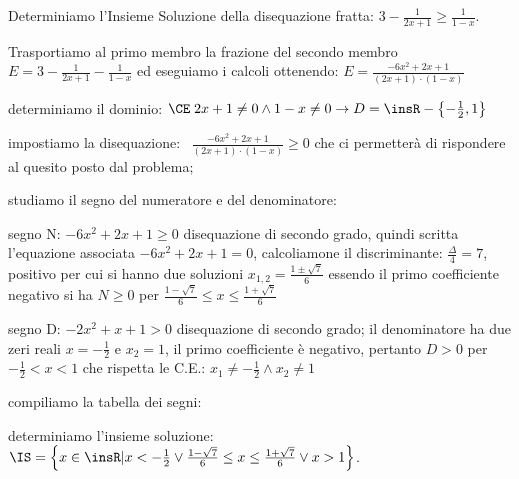\begin{exrig}
\begin{esempio}
Determiniamo l'Insieme Soluzione della disequazione fratta: $3-\frac 1{2x+1}\ge 
\frac 1{1-x}$.
\begin{enumeratea}
\item Trasportiamo al primo membro la frazione del secondo membro $E=3-\frac 
1{2x+1}-\frac 1{1-x}$ ed eseguiamo i calcoli ottenendo: 
$E=\frac{-6x^2+2x+1}{(2x+1)\cdot (1-x)}$
\item determiniamo il dominio: $\CE \;2x+1\neq 0\wedge 1-x\neq 0\to 
D=\insR-\left\{-\frac 1 2,1\right\}$
\item impostiamo la disequazione: \ $\frac{-6x^2+2x+1}{(2x+1)\cdot (1-x)}\ge 0$ 
che ci permetterà di rispondere al quesito posto dal problema;
\item studiamo il segno del numeratore e del denominatore:
\begin{itemize*}
\item segno N: $-6x^2+2x+1\ge 0$ disequazione di secondo grado, quindi scritta 
l'equazione associata $-6x^2+2x+1=0$, calcoliamone il discriminante: 
$\frac{\Delta } 4=7$, positivo per cui si hanno due soluzioni 
$x_{1,2}=\frac{1\pm \sqrt 7} 6$ essendo il primo coefficiente negativo si ha 
$N\ge 0$ per $\frac{1-\sqrt 7} 6\le x\le \frac{1+\sqrt 7} 6$
\item segno D: $-2x^2+x+1>0$ disequazione di secondo grado; il denominatore ha 
due zeri reali $x=-\frac 1 2$ e $x_2=1$, il primo coefficiente è negativo, 
pertanto $D>0$ per $-\frac 1 2<x<1$ che rispetta le C.E.: $x_1\neq -\frac 1 
2\wedge x_2\neq 1$
\end{itemize*}
\item compiliamo la tabella dei segni:
\begin{center}
 
\end{center}
\item determiniamo l'insieme soluzione: $\IS=\left\{x\in \insR | x<-\frac 1 
2\vee \frac{1-\sqrt 7} 6\le x\le \frac{1+\sqrt 7} 6\vee x>1\right\}$.
\end{enumeratea}
\end{esempio}
\end{exrig}

% 

